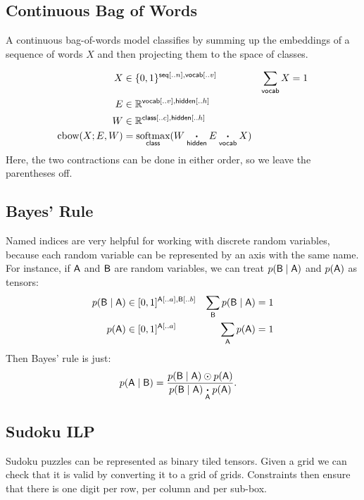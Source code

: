 \documentclass{article}
\newcommand{\reals}{\mathbb{R}}
\begin{document}
\subsection{Continuous Bag of Words}

A continuous bag-of-words model classifies by summing up the embeddings of a sequence of words $X$ and then projecting them to the space of classes. 

\begin{align*} 
X &\in \{0, 1\}^{{\nset{seq}{..n}, \nset{vocab}{..v}}} & \nsum{vocab} X &= 1\\
E &\in \reals^{{\nset{vocab}{..v}, \nset{hidden}{..h}}}\\
W &\in \reals^{{\nset{class}{..c}, \nset{hidden}{..h}}}\\
\text{cbow}(X; E, W) &= \nfun{class}{softmax} (W \ndot{hidden} E \ndot{vocab} X)
\end{align*}
Here, the two contractions can be done in either order, so we leave the parentheses off.

\subsection{Bayes' Rule}

Named indices are very helpful for working with discrete random variables, because each random variable can be represented by an axis with the same name. For instance, if $\mathsf{A}$ and $\mathsf{B}$ are random variables, we can treat $p(\mathsf{B} \mid \mathsf{A})$ and $p(\mathsf{A})$ as tensors:
\begin{align*} 
p(\mathsf{B} \mid \mathsf{A}) &\in [0, 1]^{\mathsf{A}[..a], \mathsf{B}[..b]} & \sum\limits_{\mathsf{B}} p(\mathsf{B}\mid \mathsf{A}) &= 1 \\
p(\mathsf{A}) &\in [0, 1]^{\mathsf{A}[..a]} & \sum\limits_{\mathsf{A}} p(\mathsf{A}) &= 1
\end{align*}
Then Bayes' rule is just:
\begin{align*}
p(\mathsf{A} \mid \mathsf{B}) &= \frac{p(\mathsf{B} \mid \mathsf{A}) \odot p(\mathsf{A})}{p(\mathsf{B} \mid \mathsf{A}) \mathbin{\mathop{\boldsymbol\cdot}\limits_{\mathsf{A}}} p(\mathsf{A})}.
\end{align*}

\subsection{Sudoku ILP}

Sudoku puzzles can be represented as  binary tiled tensors.
Given a grid we can check that it is valid by converting it to a grid of grids. 
Constraints then ensure that there is one digit per row, per column and per sub-box. 
\end{document}
